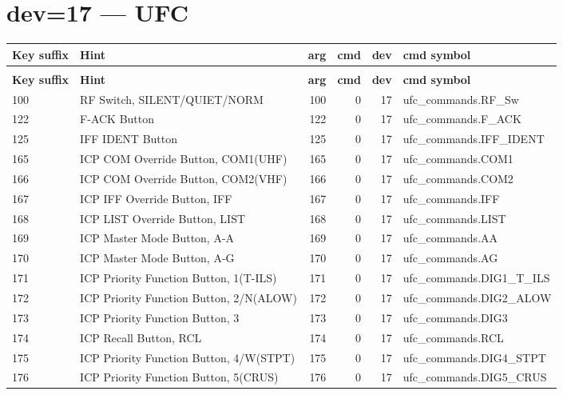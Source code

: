 \documentclass[10pt,a4paper]{article}
\begin{document}
\section{dev=17 — UFC}
\begin{longtable}{>{\ttfamily\small}p{38mm} >{\small}p{72mm} r r r >{\ttfamily\small}p{48mm}}
\toprule
\textbf{Key suffix} & \textbf{Hint} & \textbf{arg} & \textbf{cmd} & \textbf{dev} & \textbf{cmd symbol} \\
\midrule
\endfirsthead
\multicolumn{6}{l}{\small\itshape continued\ldots}\\
\toprule
\textbf{Key suffix} & \textbf{Hint} & \textbf{arg} & \textbf{cmd} & \textbf{dev} & \textbf{cmd symbol} \\
\midrule
\endhead
\bottomrule
\endfoot
\rowcolor{rowodd}
  100 & RF Switch, SILENT/QUIET/NORM & 100 & 0 & 17 & ufc\_commands.RF\_Sw \\
  122 & F-ACK Button & 122 & 0 & 17 & ufc\_commands.F\_ACK \\
\rowcolor{rowodd}
  125 & IFF IDENT Button & 125 & 0 & 17 & ufc\_commands.IFF\_IDENT \\
  165 & ICP COM Override Button, COM1(UHF) & 165 & 0 & 17 & ufc\_commands.COM1 \\
\rowcolor{rowodd}
  166 & ICP COM Override Button, COM2(VHF) & 166 & 0 & 17 & ufc\_commands.COM2 \\
  167 & ICP IFF Override Button, IFF & 167 & 0 & 17 & ufc\_commands.IFF \\
\rowcolor{rowodd}
  168 & ICP LIST Override Button, LIST & 168 & 0 & 17 & ufc\_commands.LIST \\
  169 & ICP Master Mode Button, A-A & 169 & 0 & 17 & ufc\_commands.AA \\
\rowcolor{rowodd}
  170 & ICP Master Mode Button, A-G & 170 & 0 & 17 & ufc\_commands.AG \\
  171 & ICP Priority Function Button, 1(T-ILS) & 171 & 0 & 17 & ufc\_commands.DIG1\_T\_ILS \\
\rowcolor{rowodd}
  172 & ICP Priority Function Button, 2/N(ALOW) & 172 & 0 & 17 & ufc\_commands.DIG2\_ALOW \\
  173 & ICP Priority Function Button, 3 & 173 & 0 & 17 & ufc\_commands.DIG3 \\
\rowcolor{rowodd}
  174 & ICP Recall Button, RCL & 174 & 0 & 17 & ufc\_commands.RCL \\
  175 & ICP Priority Function Button, 4/W(STPT) & 175 & 0 & 17 & ufc\_commands.DIG4\_STPT \\
\rowcolor{rowodd}
  176 & ICP Priority Function Button, 5(CRUS) & 176 & 0 & 17 & ufc\_commands.DIG5\_CRUS \\

\end{longtable}
\end{document}
